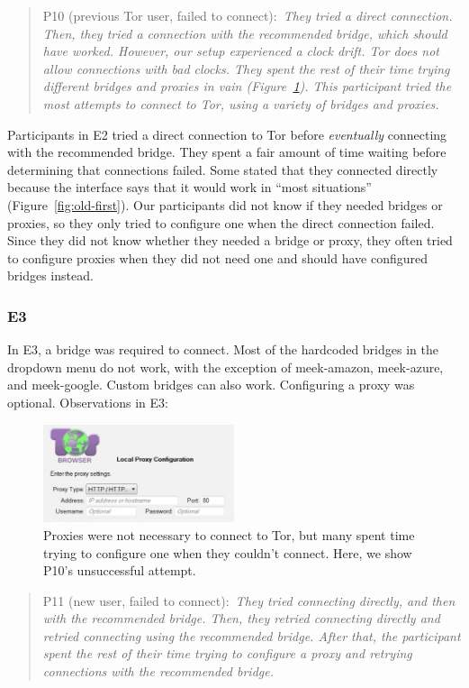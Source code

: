 \documentclass[USenglish,oneside,twocolumn]{article}
\newcommand{\pquote}[2]{
\begin{quotation}
\noindent #1:~\textit{#2}
\end{quotation}
}
\begin{document}
\pquote{P10 (previous Tor user, failed to connect)}{They tried a direct connection. Then, they tried a connection with the recommended bridge, which should have worked. However, our setup experienced a clock drift. Tor does not allow connections with bad clocks. They spent the rest of their time trying different bridges and proxies in vain (Figure~\ref{fig:proxy-attempt}). This participant tried the most attempts to connect to Tor, using a variety of bridges and proxies.}

Participants in E2 tried a direct connection to Tor before {\it eventually} connecting with the recommended bridge.
They spent a fair amount of time waiting before determining that connections failed. Some stated that they connected directly because the interface says that it would work in ``most situations'' (Figure~\ref{fig:old-first}). Our participants did not know if they needed bridges or proxies, so they only tried to configure one when the direct connection failed. Since they did not know whether they needed a bridge or proxy, they often tried to configure proxies when they did not need one and should have configured bridges instead.  

\subsubsection{E3}
In E3, a bridge was required to connect. Most of the hardcoded bridges in the dropdown menu do not work, with the exception of meek-amazon, meek-azure, and meek-google. Custom bridges can also work. Configuring a proxy was optional.
Observations in E3: 

\begin{figure}[t]
\centering
\includegraphics[width=0.5\textwidth]{P8-proxy-attempt.png}
\caption{
Proxies were not necessary to connect to Tor, but many spent time trying to configure one when they couldn't connect. Here, we show P10's unsuccessful attempt. 
}
\label{fig:proxy-attempt}
\end{figure}

\pquote{P11 (new user, failed to connect)}{They tried connecting directly, and then with the recommended bridge. Then, they retried connecting directly and retried connecting using the recommended bridge. After that, the participant spent the rest of their time trying to configure a proxy and retrying connections with the recommended bridge.}
\end{document}
